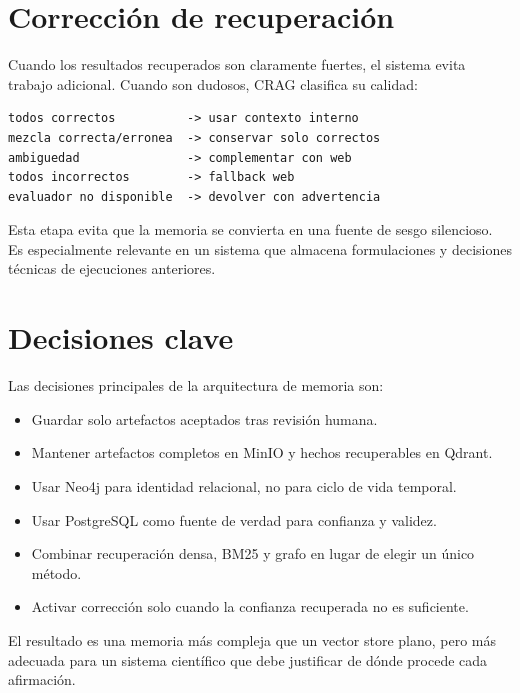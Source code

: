\section{Corrección de recuperación}

Cuando los resultados recuperados son claramente fuertes, el sistema evita
trabajo adicional. Cuando son dudosos, CRAG clasifica su calidad:

\begin{verbatim}
todos correctos          -> usar contexto interno
mezcla correcta/erronea  -> conservar solo correctos
ambiguedad               -> complementar con web
todos incorrectos        -> fallback web
evaluador no disponible  -> devolver con advertencia
\end{verbatim}

Esta etapa evita que la memoria se convierta en una fuente de sesgo silencioso.
Es especialmente relevante en un sistema que almacena formulaciones y decisiones
técnicas de ejecuciones anteriores.

\section{Decisiones clave}

Las decisiones principales de la arquitectura de memoria son:

\begin{itemize}
\item Guardar solo artefactos aceptados tras revisión humana.
\item Mantener artefactos completos en MinIO y hechos recuperables en Qdrant.
\item Usar Neo4j para identidad relacional, no para ciclo de vida temporal.
\item Usar PostgreSQL como fuente de verdad para confianza y validez.
\item Combinar recuperación densa, BM25 y grafo en lugar de elegir un único
método.
\item Activar corrección solo cuando la confianza recuperada no es suficiente.
\end{itemize}

El resultado es una memoria más compleja que un vector store plano, pero más
adecuada para un sistema científico que debe justificar de dónde procede cada
afirmación.
